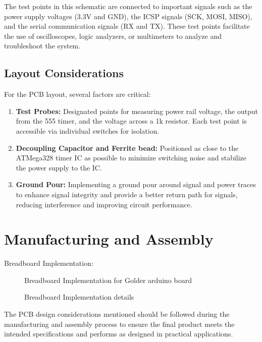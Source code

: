 \documentclass[a4paper,11pt]{article}%
\begin{document}
\begin{enumerate}
	      The test points in this schematic are connected to important signals such as the power supply voltages (3.3V and GND), the ICSP signals (SCK, MOSI, MISO), and the serial communication signals (RX and TX). These test points facilitate the use of oscilloscopes, logic analyzers, or multimeters to analyze and troubleshoot the system.
\end{enumerate}


\subsection{Layout Considerations}
For the PCB layout, several factors are critical:

\begin{enumerate}
	\item \textbf{Test Probes:} Designated points for measuring power rail voltage, the output from the 555 timer, and the voltage across a 1k resistor. Each test point is accessible via individual switches for isolation.
	\item \textbf{Decoupling Capacitor and Ferrite bead:} Positioned as close to the ATMega328 timer IC as possible to minimize switching noise and stabilize the power supply to the IC.
	\item \textbf{Ground Pour:} Implementing a ground pour around signal and power traces to enhance signal integrity and provide a better return path for signals, reducing interference and improving circuit performance.
\end{enumerate}


\pagebreak
\section{Manufacturing and Assembly}

Breadboard Implementation:


\begin{figure}[H]
	\centering
	\caption{Breadboard Implementation for Golder arduino board}
\end{figure}


\begin{figure}[H]
	\centering
	\caption{Breadboard Implementation details}
\end{figure}


The PCB design considerations mentioned should be followed during the manufacturing and assembly process to ensure the final product meets the intended specifications and performs as designed in practical applications.\\
\end{document}
